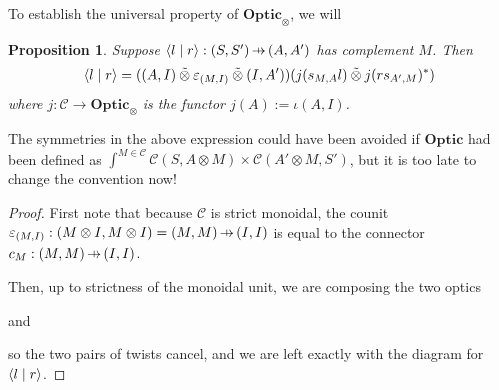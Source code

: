 \documentclass[11pt,a4paper]{article}
\theoremstyle{plain}
\newtheorem{proposition}[theorem]{Proposition}
\theoremstyle{definition}
\newcommand{\C}{\mathscr{C}}
\newcommand{\Optic}{\mathbf{Optic}}
\newcommand{\switched}{\mathbin{\tilde{\otimes}}}
\newcommand{\rep}[2]{{\ensuremath \left\langle #1 \mid #2 \right\rangle}}
\newcommand{\hto}{\ensuremath{\,\mathaccent\shortmid\rightarrow\,}}
\begin{document}

To establish the universal property of $\Optic_\otimes$, we will 

\begin{proposition}\label{prop-optic-decompose}
  Suppose $\rep{l}{r} : (S, S') \hto (A, A')$ has complement $M$. Then
  \begin{align*}
    \rep{l}{r} = ((A, I) \switched \varepsilon_{(M, I)} \switched (I, A'))(j(s_{M,A}l) \switched j(rs_{A',M})^*)
  \end{align*}
  where $j : \C \to \Optic_\otimes$ is the functor $j(A) := \iota(A, I)$.
\end{proposition}
The symmetries in the above expression could have been avoided if $\Optic$ had been defined as $\int^{M \in \C} \C(S, A \otimes M) \times \C(A' \otimes M, S')$, but it is too late to change the convention now!
\begin{proof}
  First note that because $\C$ is strict monoidal, the counit $\varepsilon_{(M, I)} : (M \otimes I, M \otimes I) = (M, M) \hto (I, I)$ is equal to the connector $c_M : (M, M) \hto (I, I)$.

  Then, up to strictness of the monoidal unit, we are composing the two optics
  \begin{center}
    
  \end{center}
  and
  \begin{center}
    
  \end{center}
  so the two pairs of twists cancel, and we are left exactly with the diagram for $\rep{l}{r}$.
\end{proof}
\end{document}
